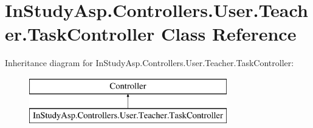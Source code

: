 \hypertarget{class_in_study_asp_1_1_controllers_1_1_user_1_1_teacher_1_1_task_controller}{}\section{In\+Study\+Asp.\+Controllers.\+User.\+Teacher.\+Task\+Controller Class Reference}
\label{class_in_study_asp_1_1_controllers_1_1_user_1_1_teacher_1_1_task_controller}
Inheritance diagram for In\+Study\+Asp.\+Controllers.\+User.\+Teacher.\+Task\+Controller\+:\begin{figure}[H]
\begin{center}
\leavevmode
\includegraphics[height=2.000000cm]{class_in_study_asp_1_1_controllers_1_1_user_1_1_teacher_1_1_task_controller}
\end{center}
\end{figure}
